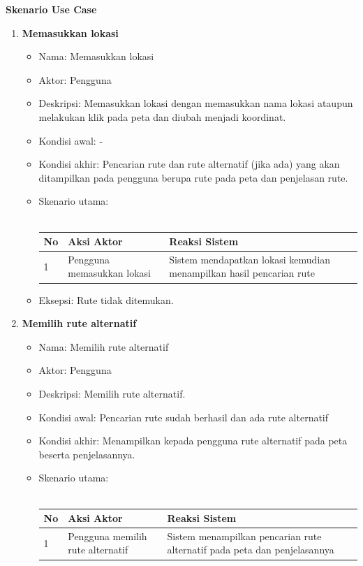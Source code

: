 \textbf{Skenario Use Case}\\
\begin{enumerate}
	\item \textbf{Memasukkan lokasi}
	\begin{itemize}
			\item Nama: Memasukkan lokasi
			\item Aktor: Pengguna
			\item Deskripsi: Memasukkan lokasi dengan memasukkan nama lokasi ataupun melakukan klik pada peta dan diubah menjadi koordinat.
			\item Kondisi awal: -
			\item Kondisi akhir: Pencarian rute dan rute alternatif (jika ada) yang akan ditampilkan pada pengguna berupa rute pada peta dan penjelasan rute.
			\item Skenario utama: \\ \\
				\begin{tabular}{|p{0.5cm} |p{6cm}| p{6cm}|}
						\hline
							No 	& Aksi Aktor & Reaksi Sistem \\ \hline
							1 	& Pengguna memasukkan lokasi 	&	Sistem mendapatkan lokasi kemudian menampilkan hasil pencarian rute \\ \hline 
						\end{tabular} 
			\item Eksepsi: Rute tidak ditemukan.
		\end{itemize}
	\item \textbf{Memilih rute alternatif}
	\begin{itemize}
			\item Nama: Memilih rute alternatif
			\item Aktor: Pengguna
			\item Deskripsi: Memilih rute alternatif.
			\item Kondisi awal: Pencarian rute sudah berhasil dan ada rute alternatif
			\item Kondisi akhir: Menampilkan kepada pengguna rute alternatif pada peta beserta penjelasannya.
			\item Skenario utama: \\ \\
				\begin{tabular}{|p{0.5cm} |p{6cm}| p{6cm}|}
						\hline
							No 	& Aksi Aktor & Reaksi Sistem \\ \hline
							1 	& Pengguna memilih rute alternatif 	&	Sistem menampilkan pencarian rute alternatif pada peta dan penjelasannya \\ \hline 

\end{tabular}
\end{itemize}
\end{enumerate}
